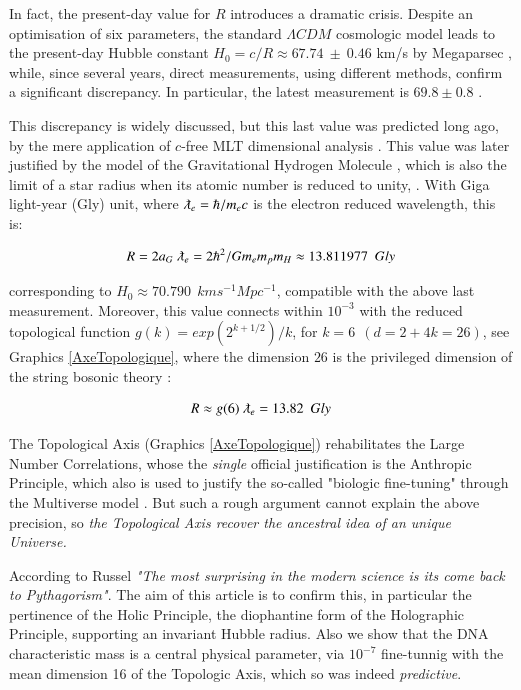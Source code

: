 \documentclass[a4paper,9pt]{article}
\begin{document}
In fact, the present-day value for $R$ introduces a dramatic crisis. Despite an optimisation of six parameters, the standard $\Lambda CDM$ cosmologic  model leads to the present-day Hubble constant $ H_0 = c/R \approx 67.74 ~\pm~ 0.46$ km/s by Megaparsec \cite{Zyla}, while, since several years, direct measurements, using different methods, confirm a significant discrepancy. In particular, the latest measurement is $69.8 \pm 0.8$ \cite{Freedman}. 

This discrepancy is widely discussed, but this last value was predicted long ago, by the mere application of $c$-free MLT dimensional analysis \cite{Sanchez1}. This value was later justified by the model of the Gravitational Hydrogen Molecule \cite{Sanchez2}, which is also the limit of a star radius when its atomic number is reduced to unity, \cite{Davies}. With Giga light-year (Gly) unit, where $\lambdabar_e = \hbar/m_ec$ is the electron reduced wavelength, this is:


\begin{equation}\label{Eq1}
R =2a_G ~\lambdabar_e  = 2 \hbar^2/Gm_e m_p m_H \approx 13.811977~~Gly 
 \end{equation}


corresponding to  $ H_0 \approx 70.790 ~~ km s^{-1} Mpc^{-1}$, compatible with the above last measurement. Moreover, this value connects within $10^{-3}$ with the reduced topological function $g(k) = exp(2^{k+1/2})/k$, for $k = 6 ~~(d = 2 +4k = 26)$, see Graphics \ref{AxeTopologique},  where the dimension $26$ is the privileged dimension of the string bosonic theory \cite{Sanchez3}:  


\begin{equation}\label{Eq2}
R \approx g(6)~\lambdabar_e  = 13.82~~Gly
 \end{equation}


The Topological Axis (Graphics \ref{AxeTopologique}) rehabilitates the Large Number Correlations, whose the \textit{single} official justification is the Anthropic Principle,  which also is used to justify the so-called "biologic fine-tuning" through the Multiverse model \cite {Rees}. But such a rough argument cannot explain the above precision, so \textit{the Topological Axis recover the ancestral idea of an unique Universe.} 


According to Russel \textit{"The most surprising in the modern science is its come back to Pythagorism"}\cite{Alcina}. The aim of this article is to confirm this, in particular the pertinence of the Holic Principle, the diophantine form of the Holographic Principle, supporting an invariant Hubble radius. Also we show that the DNA characteristic mass is a central physical parameter, via $10^{-7}$ fine-tunnig with the mean dimension 16 of the Topologic Axis, which so was indeed \textit{predictive}. 
\end{document}
